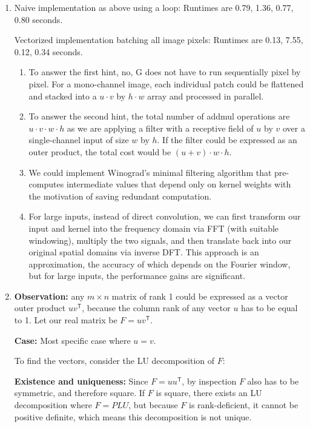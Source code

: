 \documentclass{article}
\begin{document}
\begin{enumerate}[label=(\roman*)]
\item %
Naive implementation as above using a loop: Runtimes are 0.79, 1.36, 0.77, 0.80 seconds.

Vectorized implementation batching all image pixels: Runtimes are 0.13, 7.55, 0.12, 0.34 seconds.

\begin{enumerate}
\item To answer the first hint, no, G does not have to run sequentially pixel by pixel. For a mono-channel image, each individual patch could be flattened and stacked into a $u\cdot v$ by $h\cdot w$ array and processed in parallel.

\item To answer the second hint, the total number of addmul operations are $u \cdot v \cdot w \cdot h$ as we are applying a filter with a receptive field of $u$ by $v$ over a single-channel input of size $w$ by $h$. If the filter could be expressed as an outer product, the total cost would be $(u+v) \cdot w \cdot h$.

\item We could implement Winograd's minimal filtering algorithm that pre-computes intermediate values that depend only on kernel weights with the motivation of saving redundant computation.

\item For large inputs, instead of direct convolution, we can first transform our input and kernel into the frequency domain via FFT (with suitable windowing), multiply the two signals, and then translate back into our original spatial domains via inverse DFT. This approach is an approximation, the accuracy of which depends on the Fourier window, but for large inputs, the performance gains are significant.
\end{enumerate}

\item %
\textbf{Observation:} any $m\times n$ matrix of rank 1 could be expressed as a vector outer product $uv^\mathsf{T}$, because the column rank of any vector $u$ has to be equal to 1. Let our real matrix be $F = uv^\mathsf{T}$.

\textbf{Case:} Most specific case where $u = v$.

To find the vectors, consider the LU decomposition of $F$:

\textbf{Existence and uniqueness:} Since $F=uu^\mathsf{T}$, by inspection $F$ also has to be symmetric, and therefore square. If $F$ is square, there exists an LU decomposition where $F=PLU$, but because $F$ is rank-deficient, it cannot be positive definite, which means this decomposition is not unique.


\end{enumerate}
\end{document}
